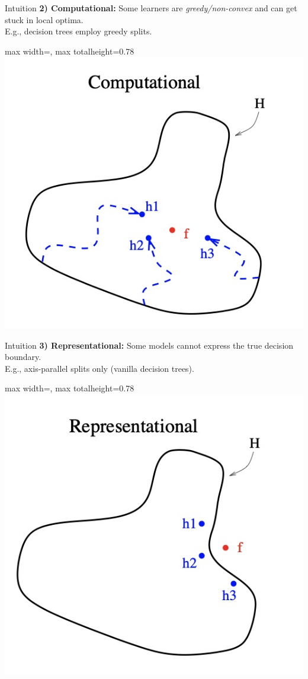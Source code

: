 \documentclass[aspectratio=169,10pt]{beamer}
\newcommand{\fitpic}[1]{\begin{adjustbox}{max width=\linewidth, max totalheight=0.78\textheight}#1\end{adjustbox}}
\begin{document}
\begin{frame}{Intuition}
  \pause \textbf{2) Computational:} Some learners are \textit{greedy/non-convex} and can get stuck in local optima.\\
  \pause E.g., decision trees employ greedy splits.

  \vspace{0.5cm}
  \fitpic{\includegraphics[scale=0.2]{../assets/ensemble/diagrams/computational.jpg}}
\end{frame}

\begin{frame}{Intuition}
  \pause \textbf{3) Representational:} Some models cannot express the true decision boundary.\\
  \pause E.g., axis-parallel splits only (vanilla decision trees).

  \vspace{0.5cm}
  \fitpic{\includegraphics[scale=0.2]{../assets/ensemble/diagrams/representational.jpg}}
\end{frame}
\end{document}
